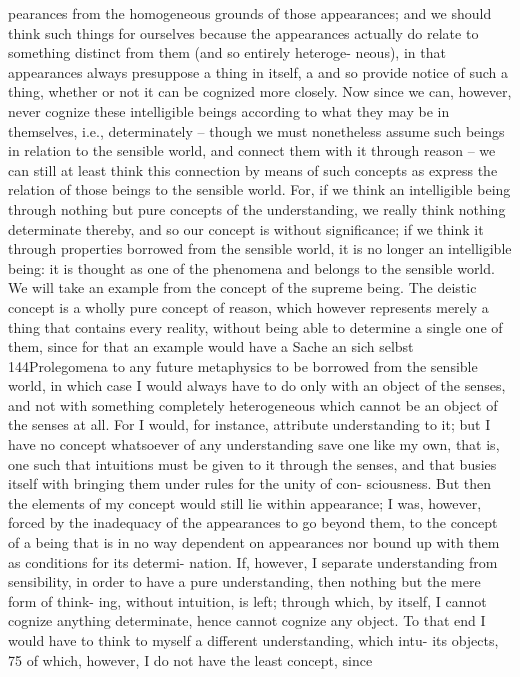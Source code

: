 pearances from the homogeneous grounds of those appearances; and we
should think such things for ourselves because the appearances actually
do relate to something distinct from them (and so entirely heteroge-
neous), in that appearances always presuppose a thing in itself, a and so
provide notice of such a thing, whether or not it can be cognized more
closely.
Now since we can, however, never cognize these intelligible beings
according to what they may be in themselves, i.e., determinately – though
we must nonetheless assume such beings in relation to the sensible world,
and connect them with it through reason – we can still at least think this
connection by means of such concepts as express the relation of those
beings to the sensible world. For, if we think an intelligible being through
nothing but pure concepts of the understanding, we really think nothing
determinate thereby, and so our concept is without signiﬁcance; if we
think it through properties borrowed from the sensible world, it is no
longer an intelligible being: it is thought as one of the phenomena and
belongs to the sensible world. We will take an example from the concept
of the supreme being.
The deistic concept is a wholly pure concept of reason, which however
represents merely a thing that contains every reality, without being able
to determine a single one of them, since for that an example would have
a
Sache an sich selbst
144Prolegomena to any future metaphysics
to be borrowed from the sensible world, in which case I would always
have to do only with an object of the senses, and not with something
completely heterogeneous which cannot be an object of the senses at
all. For I would, for instance, attribute understanding to it; but I have
no concept whatsoever of any understanding save one like my own, that
is, one such that intuitions must be given to it through the senses, and
that busies itself with bringing them under rules for the unity of con-
sciousness. But then the elements of my concept would still lie within
appearance; I was, however, forced by the inadequacy of the appearances
to go beyond them, to the concept of a being that is in no way dependent
on appearances nor bound up with them as conditions for its determi-
nation. If, however, I separate understanding from sensibility, in order
to have a pure understanding, then nothing but the mere form of think-
ing, without intuition, is left; through which, by itself, I cannot cognize
anything determinate, hence cannot cognize any object. To that end I
would have to think to myself a different understanding, which intu-
its objects, 75 of which, however, I do not have the least concept, since
